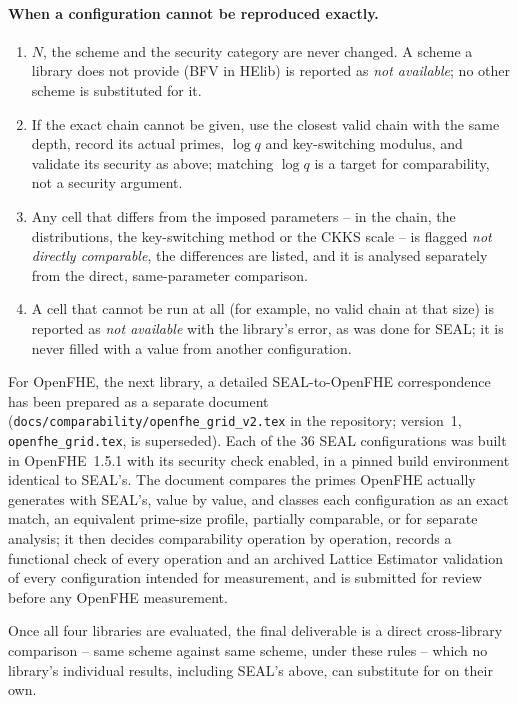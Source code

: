 \paragraph{When a configuration cannot be reproduced exactly.}
\begin{enumerate}[leftmargin=*, itemsep=2pt]
  \item $N$, the scheme and the security category are never changed. A scheme a library does not provide (BFV in HElib) is reported as \emph{not available}; no other scheme is substituted for it.
  \item If the exact chain cannot be given, use the closest valid chain with the same depth, record its actual primes, $\log q$ and key-switching modulus, and validate its security as above; matching $\log q$ is a target for comparability, not a security argument.
  \item Any cell that differs from the imposed parameters -- in the chain, the distributions, the key-switching method or the CKKS scale -- is flagged \emph{not directly comparable}, the differences are listed, and it is analysed separately from the direct, same-parameter comparison.
  \item A cell that cannot be run at all (for example, no valid chain at that size) is reported as \emph{not available} with the library's error, as was done for SEAL; it is never filled with a value from another configuration.
\end{enumerate}

For OpenFHE, the next library, a detailed SEAL-to-OpenFHE correspondence has been prepared as a separate document (\texttt{docs/comparability/openfhe\_grid\_v2.tex} in the repository; version~1, \texttt{openfhe\_grid.tex}, is superseded). Each of the 36 SEAL configurations was built in OpenFHE~1.5.1 with its security check enabled, in a pinned build environment identical to SEAL's. The document compares the primes OpenFHE actually generates with SEAL's, value by value, and classes each configuration as an exact match, an equivalent prime-size profile, partially comparable, or for separate analysis; it then decides comparability operation by operation, records a functional check of every operation and an archived Lattice Estimator validation of every configuration intended for measurement, and is submitted for review before any OpenFHE measurement.

Once all four libraries are evaluated, the final deliverable is a direct cross-library comparison -- same scheme against same scheme, under these rules -- which no library's individual results, including SEAL's above, can substitute for on their own.
